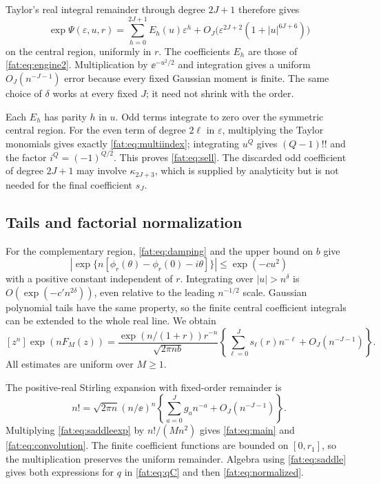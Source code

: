 \documentclass[11pt,letterpaper]{article}
\numberwithin{equation}{section}
\theoremstyle{remark}\newtheorem{remark}[theorem]{Remark}
\begin{document}
Taylor's real integral remainder through degree $2J+1$ therefore gives
\begin{equation}\label{fat:eq:remainder}
 \exp\Psi(\varepsilon,u,r)
 =\sum_{h=0}^{2J+1}E_h(u)\varepsilon^h
 +O_J\bigl(\varepsilon^{2J+2}(1+|u|^{6J+6})\bigr)
\end{equation}
on the central region, uniformly in $r$. The coefficients $E_h$ are those of \eqref{fat:eq:engine2}. Multiplication by $\ee^{-u^2/2}$ and integration gives a uniform $O_J(n^{-J-1})$ error because every fixed Gaussian moment is finite. The same choice of $\delta$ works at every fixed $J$; it need not shrink with the order.

Each $E_h$ has parity $h$ in $u$. Odd terms integrate to zero over the symmetric central region. For the even term of degree $2\ell$ in $\varepsilon$, multiplying the Taylor monomials gives exactly \eqref{fat:eq:multiindex}; integrating $u^Q$ gives $(Q-1)!!$ and the factor $i^Q=(-1)^{Q/2}$. This proves \eqref{fat:eq:sell}. The discarded odd coefficient of degree $2J+1$ may involve $\kappa_{2J+3}$, which is supplied by analyticity but is not needed for the final coefficient $s_J$.

\subsection{Tails and factorial normalization}
For the complementary region, \eqref{fat:eq:damping} and the upper bound on $b$ give
\[
 \left|\exp\{n[\phi_r(\theta)-\phi_r(0)-i\theta]\}\right|
 \le\exp(-c u^2)
\]
with a positive constant independent of $r$. Integrating over $|u|>n^\delta$ is $O(\exp(-c' n^{2\delta}))$, even relative to the leading $n^{-1/2}$ scale. Gaussian polynomial tails have the same property, so the finite central coefficient integrals can be extended to the whole real line. We obtain
\begin{equation}\label{fat:eq:saddleexp}
 [z^n]\exp(nF_M(z))=
 \frac{\exp(n/(1+r))r^{-n}}{\sqrt{2\pi nb}}
 \left\{\sum_{\ell=0}^{J}s_\ell(r)n^{-\ell}+O_J(n^{-J-1})\right\}.
\end{equation}
All estimates are uniform over $M\ge1$.

The positive-real Stirling expansion with fixed-order remainder \cite{dlmf} is
\[
 n!=\sqrt{2\pi n}(n/\ee)^n
 \left\{\sum_{a=0}^{J}g_an^{-a}+O_J(n^{-J-1})\right\}.
\]
Multiplying \eqref{fat:eq:saddleexp} by $n!/(Mn^2)$ gives \eqref{fat:eq:main} and \eqref{fat:eq:convolution}. The finite coefficient functions are bounded on $[0,r_1]$, so the multiplication preserves the uniform remainder. Algebra using \eqref{fat:eq:saddle} gives both expressions for $q$ in \eqref{fat:eq:qC} and then \eqref{fat:eq:normalized}.
\end{document}
